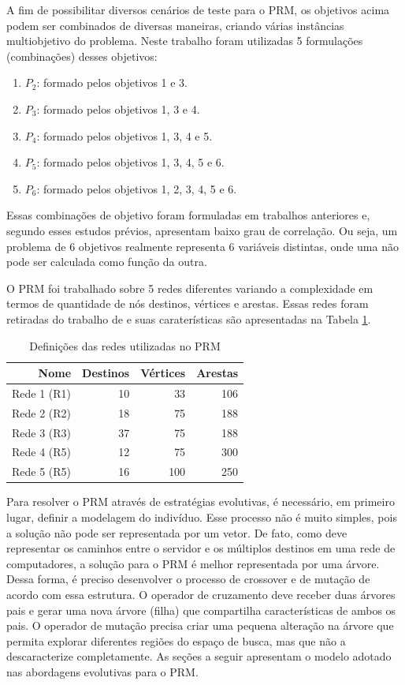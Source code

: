 A fim de possibilitar diversos cenários de teste para o PRM, os objetivos acima podem ser combinados de diversas maneiras, criando várias instâncias multiobjetivo do problema. Neste trabalho foram utilizadas 5 formulações (combinações) desses objetivos:

\begin{enumerate}
	\item $P_2$: formado pelos objetivos 1 e 3.
	\item $P_3$: formado pelos objetivos 1, 3 e 4.
	\item $P_4$: formado pelos objetivos 1, 3, 4 e 5.
	\item $P_5$: formado pelos objetivos 1, 3, 4, 5 e 6.
	\item $P_6$: formado pelos objetivos 1, 2, 3, 4, 5 e 6.
\end{enumerate}

Essas combinações de objetivo foram formuladas em trabalhos anteriores \cite{LafetaThesis,BuenoThesis} e, segundo esses estudos prévios, apresentam baixo grau de correlação. Ou seja, um problema de 6 objetivos realmente representa 6 variáveis distintas, onde uma não pode ser calculada como função da outra.

O PRM foi trabalhado sobre 5 redes diferentes variando a complexidade em termos de quantidade de nós destinos, vértices e arestas. Essas redes foram retiradas do trabalho de \cite{Lafeta2016} e suas caraterísticas são apresentadas na Tabela \ref{tab_prm_redes}.

\begin{table}[!htbp]
	\centering
	\caption{Definições das redes utilizadas no PRM}
	\label{tab_prm_redes}
	\begin{tabular}{r|rrr}
		Nome        & Destinos & Vértices & Arestas \\ \hline
		Rede 1 (R1) & 10       & 33       & 106     \\
		Rede 2 (R2) & 18       & 75       & 188     \\
		Rede 3 (R3) & 37       & 75       & 188     \\
		Rede 4 (R5) & 12       & 75       & 300     \\
		Rede 5 (R5) & 16       & 100      & 250     \\ \hline
	\end{tabular}
\end{table}

Para resolver o PRM através de estratégias evolutivas, é necessário, em primeiro lugar, definir a modelagem do indivíduo. Esse processo não é muito simples, pois a solução não pode ser representada por um vetor. De fato, como deve representar os caminhos entre o servidor e os múltiplos destinos em uma rede de computadores, a solução para o PRM é melhor representada por uma árvore. Dessa forma, é preciso desenvolver o processo de crossover e de mutação de acordo com essa estrutura. O operador de cruzamento deve receber duas árvores pais e gerar uma nova árvore (filha) que compartilha características de ambos os pais. O operador de mutação precisa criar uma pequena alteração na árvore que permita explorar diferentes regiões do espaço de busca, mas que não a descaracterize completamente. As seções a seguir apresentam o modelo adotado nas abordagens evolutivas para o PRM.

